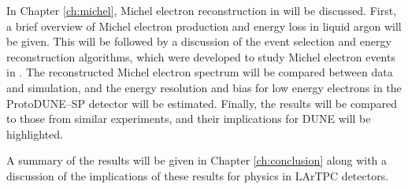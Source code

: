 In Chapter \ref{ch:michel}, Michel electron reconstruction in \protodune{} will
be discussed. First, a brief overview of Michel electron production and energy 
loss in liquid argon will be given. This will be followed by a discussion of 
the event selection and energy reconstruction algorithms, which were developed 
to study Michel electron events in \protodune{}. The reconstructed Michel 
electron spectrum will be compared between data and simulation, and the energy 
resolution and bias for low energy electrons in the ProtoDUNE--SP detector 
will be estimated. Finally, the results will be compared to those from similar 
experiments, and their implications for DUNE will be highlighted.

A summary of the results will be given in Chapter \ref{ch:conclusion} along 
with a discussion of the implications of these results for physics in LArTPC 
detectors.

